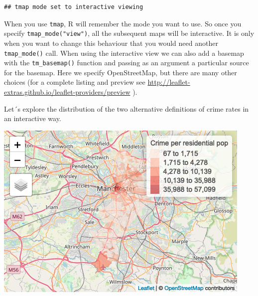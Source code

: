 \documentclass[
  krantz2]{krantz}
\makeatletter
\newenvironment{Shaded}{\begin{snugshade}}{\end{snugshade}}
\newcommand{\AttributeTok}[1]{\textcolor[rgb]{0.61,0.61,0.61}{#1}}
\newcommand{\FloatTok}[1]{\textcolor[rgb]{0.06,0.06,0.06}{#1}}
\newcommand{\FunctionTok}[1]{\textcolor[rgb]{0,0,0}{#1}}
\newcommand{\NormalTok}[1]{#1}
\newcommand{\SpecialCharTok}[1]{\textcolor[rgb]{0,0,0}{#1}}
\newcommand{\StringTok}[1]{\textcolor[rgb]{0.5,0.5,0.5}{#1}}
\newenvironment{kframe}{%
\medskip{}
\setlength{\fboxsep}{.8em}
 \def\at@end@of@kframe{}%
 \ifinner\ifhmode%
  \def\at@end@of@kframe{\end{minipage}}%
  \begin{minipage}{\columnwidth}%
 \fi\fi%
 \def\FrameCommand##1{\hskip\@totalleftmargin \hskip-\fboxsep
 \colorbox{shadecolor}{##1}\hskip-\fboxsep
     \hskip-\linewidth \hskip-\@totalleftmargin \hskip\columnwidth}%
 \MakeFramed {\advance\hsize-\width
   \@totalleftmargin\z@ \linewidth\hsize
   \@setminipage}}%
 {\par\unskip\endMakeFramed%
 \at@end@of@kframe}
\renewenvironment{Shaded}{\begin{kframe}}{\end{kframe}}
\makeatother
\begin{document}
\begin{verbatim}
## tmap mode set to interactive viewing
\end{verbatim}

When you use \texttt{tmap}, R will remember the mode you want to use. So once you specify \texttt{tmap\_mode("view")}, all the subsequent maps will be interactive. It is only when you want to change this behaviour that you would need another \texttt{tmap\_mode()} call. When using the interactive view we can also add a basemap with the \texttt{tm\_basemap()} function and passing as an argument a particular source for the basemap. Here we specify OpenStreetMap, but there are many other choices (for a complete listing and preview see \url{http://leaflet-extras.github.io/leaflet-providers/preview} ).

Let´s explore the distribution of the two alternative definitions of crime rates in an interactive way.

\begin{Shaded}
\end{Shaded}

\includegraphics{crime_mapping_files/figure-latex/unnamed-chunk-103-1.png}
\end{document}

